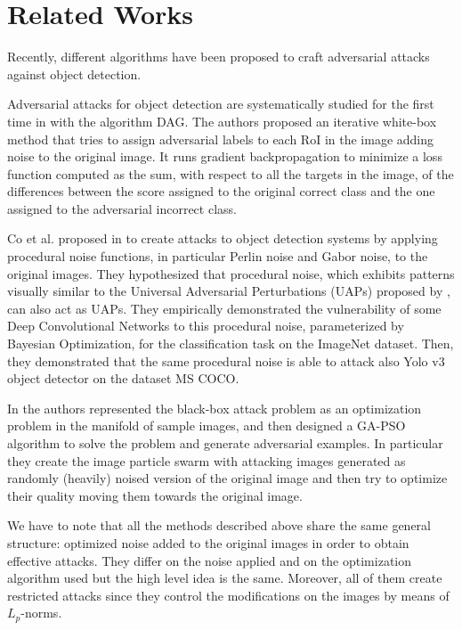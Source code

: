 \chapter{Related Works} \label{sec:related}
Recently, different algorithms have been proposed to craft 
adversarial attacks against object detection.

Adversarial attacks for object detection are systematically studied for the first time in \cite{xie2017adversarial} with the algorithm DAG. The authors proposed an iterative white-box method that tries to assign adversarial labels to each RoI in the image adding noise to the original image. It runs gradient backpropagation to minimize a loss function computed as the sum, with respect to all the targets in the image, of the differences between the score assigned to the original correct class and the one assigned to the adversarial incorrect class.

Co et al. proposed in \cite{procNoise_co2019} to create attacks to object detection systems by applying procedural noise functions, in particular Perlin noise and Gabor noise, to the original images. They hypothesized that procedural noise, which exhibits patterns visually similar to the Universal Adversarial Perturbations (UAPs) proposed by \cite{MoosaviDezfooli2017UniversalAP}, can also act as UAPs. They empirically demonstrated the vulnerability of some Deep Convolutional Networks to this procedural noise, parameterized by Bayesian Optimization, for the classification task on the ImageNet dataset. Then, they demonstrated that the same procedural noise is able to attack also Yolo v3 object detector on the dataset MS COCO.

In \cite{wang2020adversarial} the authors represented the black-box attack problem as an optimization problem in the manifold of sample images, and then designed a GA-PSO algorithm to solve the problem and generate adversarial examples. In particular they create the image particle swarm with attacking images generated as randomly (heavily) noised version of the original image and then try to optimize their quality moving them towards the original image.

We have to note that all the methods described above share the same general structure: optimized noise added to the original images in order to obtain effective attacks. They differ on the noise applied and on the optimization algorithm used but the high level idea is the same. Moreover, all of them create restricted attacks since they control the modifications on the images by means of $L_p$-norms.  

